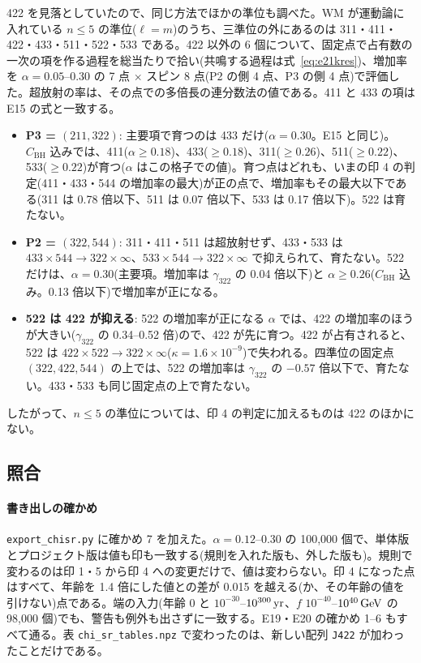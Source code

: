 422 を見落としていたので、同じ方法でほかの準位も調べた。WM が運動論に入れている $n\le5$ の準位($\ell=m$)のうち、三準位の外にあるのは 311・411・422・433・511・522・533 である。422 以外の 6 個について、固定点で占有数の一次の項を作る過程を総当たりで拾い(共鳴する過程は式~\eqref{eq:e21kres})、増加率を $\alpha=0.05$--0.30 の 7 点 $\times$ スピン 8 点(P2 の側 4 点、P3 の側 4 点)で評価した。超放射の率は、その点での多倍長の連分数法の値である。411 と 433 の項は E15 の式と一致する。
\begin{itemize}
\item \textbf{P3 = $(211,322)$}: 主要項で育つのは 433 だけ($\alpha=0.30$。E15 と同じ)。$C_\mathrm{BH}$ 込みでは、411($\alpha\ge0.18$)、433($\ge0.18$)、311($\ge0.26$)、511($\ge0.22$)、533($\ge0.22$)が育つ($\alpha$ はこの格子での値)。育つ点はどれも、いまの印 4 の判定(411・433・544 の増加率の最大)が正の点で、増加率もその最大以下である(311 は 0.78 倍以下、511 は 0.07 倍以下、533 は 0.17 倍以下)。522 は育たない。
\item \textbf{P2 = $(322,544)$}: 311・411・511 は超放射せず、433・533 は $433\times544\to322\times\infty$、$533\times544\to322\times\infty$ で抑えられて、育たない。522 だけは、$\alpha=0.30$(主要項。増加率は $\gamma_{322}$ の 0.04 倍以下)と $\alpha\ge0.26$($C_\mathrm{BH}$ 込み。0.13 倍以下)で増加率が正になる。
\item \textbf{522 は 422 が抑える}: 522 の増加率が正になる $\alpha$ では、422 の増加率のほうが大きい($\gamma_{322}$ の 0.34--0.52 倍)ので、422 が先に育つ。422 が占有されると、522 は $422\times522\to322\times\infty$($\kappa=1.6\times10^{-9}$)で失われる。四準位の固定点 $(322,422,544)$ の上では、522 の増加率は $\gamma_{322}$ の $-0.57$ 倍以下で、育たない。433・533 も同じ固定点の上で育たない。
\end{itemize}
したがって、$n\le5$ の準位については、印 4 の判定に加えるものは 422 のほかにない。

\subsection{照合}

\paragraph{書き出しの確かめ}
\texttt{export\_chisr.py} に確かめ 7 を加えた。$\alpha=0.12$--0.30 の 100{,}000 個で、単体版とプロジェクト版は値も印も一致する(規則を入れた版も、外した版も)。規則で変わるのは印 1・5 から印 4 への変更だけで、値は変わらない。印 4 になった点はすべて、年齢を 1.4 倍にした値との差が 0.015 を越える(か、その年齢の値を引けない)点である。端の入力(年齢 0 と $10^{-30}$--$10^{300}\,\mathrm{yr}$、$f$ $10^{-40}$--$10^{40}\,\mathrm{GeV}$ の 98{,}000 個)でも、警告も例外も出さずに一致する。E19・E20 の確かめ 1--6 もすべて通る。表 \texttt{chi\_sr\_tables.npz} で変わったのは、新しい配列 \texttt{J422} が加わったことだけである。

